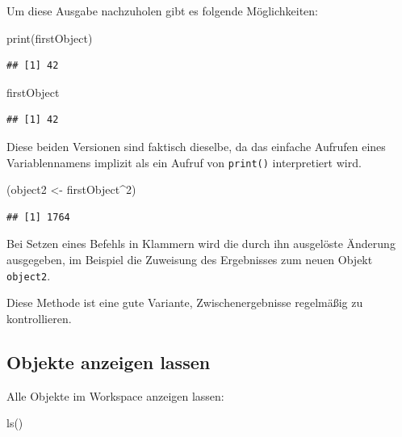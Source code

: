 \documentclass[
]{book}
\newenvironment{Shaded}{\begin{snugshade}}{\end{snugshade}}
\newcommand{\DecValTok}[1]{\textcolor[rgb]{0.00,0.00,0.81}{#1}}
\newcommand{\FunctionTok}[1]{\textcolor[rgb]{0.00,0.00,0.00}{#1}}
\newcommand{\NormalTok}[1]{#1}
\newcommand{\OtherTok}[1]{\textcolor[rgb]{0.56,0.35,0.01}{#1}}
\newcommand{\SpecialCharTok}[1]{\textcolor[rgb]{0.00,0.00,0.00}{#1}}
\begin{document}
Um diese Ausgabe nachzuholen gibt es folgende Möglichkeiten:

\begin{Shaded}
\begin{Highlighting}[]
\FunctionTok{print}\NormalTok{(firstObject)}
\end{Highlighting}
\end{Shaded}

\begin{verbatim}
## [1] 42
\end{verbatim}

\begin{Shaded}
\begin{Highlighting}[]
\NormalTok{firstObject}
\end{Highlighting}
\end{Shaded}

\begin{verbatim}
## [1] 42
\end{verbatim}

Diese beiden Versionen sind faktisch dieselbe, da das einfache Aufrufen eines Variablennamens implizit als ein Aufruf von \texttt{print()} interpretiert wird.

\begin{Shaded}
\begin{Highlighting}[]
\NormalTok{(object2 }\OtherTok{\textless{}{-}}\NormalTok{ firstObject}\SpecialCharTok{\^{}}\DecValTok{2}\NormalTok{)}
\end{Highlighting}
\end{Shaded}

\begin{verbatim}
## [1] 1764
\end{verbatim}

Bei Setzen eines Befehls in Klammern wird die durch ihn ausgelöste Änderung ausgegeben, im Beispiel die Zuweisung des Ergebnisses zum neuen Objekt \texttt{object2}.

Diese Methode ist eine gute Variante, Zwischenergebnisse regelmäßig zu kontrollieren.

\hypertarget{objekte-anzeigen-lassen}{%
\subsection*{Objekte anzeigen lassen}\label{objekte-anzeigen-lassen}}

Alle Objekte im Workspace anzeigen lassen:

\begin{Shaded}
\begin{Highlighting}[]
\FunctionTok{ls}\NormalTok{()}
\end{Highlighting}
\end{Shaded}
\end{document}
